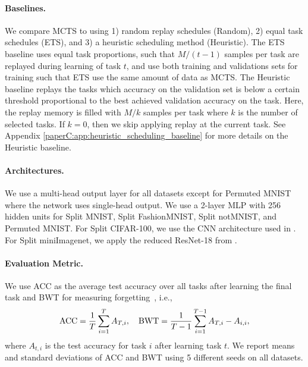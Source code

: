 \vspace{-3mm}
\paragraph{Baselines.} We compare MCTS to using 1) random replay schedules (Random), 2) equal task schedules (ETS), and 3) a heuristic scheduling method (Heuristic). The ETS baseline uses equal task proportions, such that $M/(t-1)$ samples per task are replayed during learning of task $t$, and use both training and validations sets for training such that ETS use the same amount of data as MCTS. %
The Heuristic baseline replays the tasks which accuracy on the validation set is below a certain threshold proportional to the best achieved validation accuracy on the task. Here, the replay memory is filled with $M/k$ samples per task where $k$ is the number of selected tasks. If $k=0$, then we skip applying replay at the current task.  
See Appendix \ref{paperC:app:heuristic_scheduling_baseline} for more details on the Heuristic baseline. 



%

\vspace{-3mm}
\paragraph{Architectures.} We use a multi-head output layer for all datasets except for Permuted MNIST where the network uses single-head output. We use a 2-layer MLP with 256 hidden units for Split MNIST, Split FashionMNIST, Split notMNIST, and Permuted MNIST. For Split CIFAR-100, we use the CNN architecture used in . For Split miniImagenet, we apply the reduced ResNet-18 from . 

\vspace{-3mm}
\paragraph{Evaluation Metric.} 
We use ACC as the average test accuracy over all tasks after learning the final task and BWT for measuring forgetting~, i.e.,
\begin{align}
	\textnormal{ACC} = \frac{1}{T} \sum_{i=1}^{T} A_{T, i}, \quad \textnormal{BWT} = \frac{1}{T-1} \sum_{i=1}^{T-1} A_{T, i} - A_{i, i},
\end{align}
where $A_{t, i}$ is the test accuracy for task $i$ after learning task $t$. We report means and standard deviations of ACC and BWT using 5 different seeds on all datasets. 




